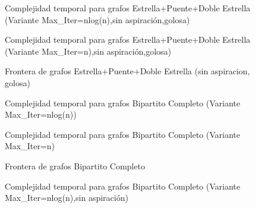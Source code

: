 \begin{figure}[H]
    \centering
    \fontsize{8}{10}\selectfont
    \resizebox{0.87\textwidth}{!}{}
    \caption{Complejidad temporal para grafos Estrella+Puente+Doble Estrella (Variante Max\_Iter=nlog(n),sin aspiraci\'on,golosa)}
\end{figure}

\begin{figure}[H]
    \centering
    \fontsize{8}{10}\selectfont
    \resizebox{0.87\textwidth}{!}{}
    \caption{Complejidad temporal para grafos Estrella+Puente+Doble Estrella (Variante Max\_Iter=n),sin aspiraci\'on,golosa)}
\end{figure}

\begin{figure}[H]
    \centering
    \fontsize{8}{10}\selectfont
    \resizebox{0.87\textwidth}{!}{}
    \caption{Frontera de grafos Estrella+Puente+Doble Estrella (sin aspiracion, golosa)}
\end{figure}

\begin{figure}[H]
    \centering
    \fontsize{8}{10}\selectfont
    \resizebox{0.87\textwidth}{!}{}
    \caption{Complejidad temporal para grafos Bipartito Completo (Variante Max\_Iter=nlog(n))}
\end{figure}

\begin{figure}[H]
    \centering
    \fontsize{8}{10}\selectfont
    \resizebox{0.87\textwidth}{!}{}
    \caption{Complejidad temporal para grafos Bipartito Completo (Variante Max\_Iter=n)}
\end{figure}

\begin{figure}[H]
    \centering
    \fontsize{8}{10}\selectfont
    \resizebox{0.87\textwidth}{!}{}
    \caption{Frontera de grafos Bipartito Completo}
\end{figure}

\begin{figure}[H]
    \centering
    \fontsize{8}{10}\selectfont
    \resizebox{0.87\textwidth}{!}{}
    \caption{Complejidad temporal para grafos Bipartito Completo (Variante Max\_Iter=nlog(n),sin aspiraci\'on)}
\end{figure}

